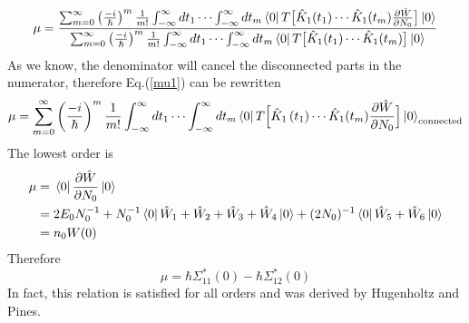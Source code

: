 \documentclass[12pt]{article}
\begin{document}
\begin{equation}\label{mu1}
    \mu=\frac{\sum_{m=0}^{\infty}\left(\frac{-i}{\hbar}\right)^{m}\frac{1}{m!} 
    \int_{-\infty}^{\infty}dt_{1}\cdots\int_{-\infty}^{\infty}dt_{m}\bra*{0}T\big[
    \hat{K}_1(t_1)\cdots\hat{K}_1(t_m) \frac{\partial\hat{W}}{\partial N_0}\big]
    \ket*{0}}{\sum_{m=0}^{\infty}\left(\frac{-i}{\hbar}\right)^{m}\frac{1}{m!}
    \int_{-\infty}^{\infty}dt_{1}\cdots\int_{-\infty}^{\infty}dt_m\bra*{0}T\big[
    \hat{K}_{1}(t_1)\cdots\hat{K}_{1}(t_m)\big]\ket*{0}}
\end{equation}
As we know, the denominator will cancel the disconnected parts in the numerator, 
therefore Eq.(\ref{mu1}) can be rewritten 
\begin{equation}\label{mu1re}
    \mu=\sum_{m=0}^{\infty}\left(\frac{-i}{\hbar}\right)^{m} \frac{1}{m!}\int_
    {-\infty}^{\infty}dt_1\cdots \int_{-\infty}^{\infty}dt_m\bra*{0}T\Big[\hat{K}_1
    \left(t_{1}\right)\cdots\hat{K}_1(t_m) \frac{\partial\hat{W}}{\partial N_0}
    \Big] \ket*{0}_{\text{connected}}
\end{equation}
The lowest order is 
\begin{equation}
    \begin{split}
        \mu&=\bra*{0}\frac{\partial\hat{W}}{\partial N_0}\ket*{0}\\
        &=2 E_0N_0^{-1}+N_0^{-1}\bra*{0}\hat{W}_1+\hat{W}_2+\hat{W}_3+\hat{W}_4
        \ket*{0}+(2N_0)^{-1}\bra*{0}\hat{W}_5+\hat{W}_6\ket*{0}\\
        &=n_0W(0)
    \end{split}
\end{equation}
Therefore 
\begin{equation}\label{Hugenholtz}
    \mu=\hbar\Sigma^*_{11}(0)-\hbar\Sigma^*_{12}(0)
\end{equation}
In fact, this relation is satisfied for all orders and was derived by Hugenholtz 
and Pines.
\end{document}
